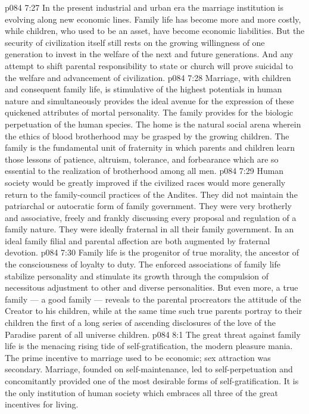 \vs p084 7:27 \pc In the present industrial and urban era the marriage institution is evolving along new economic lines. Family life has become more and more costly, while children, who used to be an asset, have become economic liabilities. But the security of civilization itself still rests on the growing willingness of one generation to invest in the welfare of the next and future generations. And any attempt to shift parental responsibility to state or church will prove suicidal to the welfare and advancement of civilization.
\vs p084 7:28 \pc Marriage, with children and consequent family life, is stimulative of the highest potentials in human nature and simultaneously provides the ideal avenue for the expression of these quickened attributes of mortal personality. The family provides for the biologic perpetuation of the human species. The home is the natural social arena wherein the ethics of blood brotherhood may be grasped by the growing children. The family is the fundamental unit of fraternity in which parents and children learn those lessons of patience, altruism, tolerance, and forbearance which are so essential to the realization of brotherhood among all men.
\vs p084 7:29 Human society would be greatly improved if the civilized races would more generally return to the family\hyp{}council practices of the Andites. They did not maintain the patriarchal or autocratic form of family government. They were very brotherly and associative, freely and frankly discussing every proposal and regulation of a family nature. They were ideally fraternal in all their family government. In an ideal family filial and parental affection are both augmented by fraternal devotion.
\vs p084 7:30 Family life is the progenitor of true morality, the ancestor of the consciousness of loyalty to duty. The enforced associations of family life stabilize personality and stimulate its growth through the compulsion of necessitous adjustment to other and diverse personalities. But even more, a true family --- a good family --- reveals to the parental procreators the attitude of the Creator to his children, while at the same time such true parents portray to their children the first of a long series of ascending disclosures of the love of the Paradise parent of all universe children.
\vs p084 8:1 The great threat against family life is the menacing rising tide of self\hyp{}gratification, the modern pleasure mania. The prime incentive to marriage used to be economic; sex attraction was secondary. Marriage, founded on self\hyp{}maintenance, led to self\hyp{}perpetuation and concomitantly provided one of the most desirable forms of self\hyp{}gratification. It is the only institution of human society which embraces all three of the great incentives for living.
